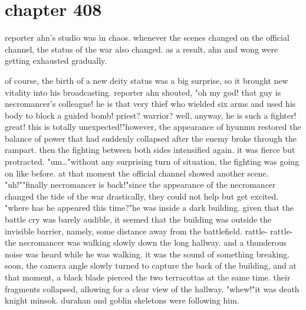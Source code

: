 \section{chapter 408}

reporter ahn's studio was in chaos.
 whenever the scenes changed on the official channel, the status of the war also changed.
 as a result, ahn and wong were getting exhausted gradually.





of course, the birth of a new deity status was a big surprise, so it brought new vitality into his broadcasting.
reporter ahn shouted, "oh my god! that guy is necromancer's colleague! he is that very thief who wielded six arms and used his body to block a guided bomb! priest? warrior? well, anyway, he is such a fighter! great! this is totally unexpected!"however, the appearance of hyunmu restored the balance of power that had suddenly collapsed after the enemy broke through the rampart.
then the fighting between both sides intensified again.
 it was fierce but protracted.
"um…"without any surprising turn of situation, the fighting was going on like before.
 at that moment the official channel showed another scene.
 "uh!""finally necromancer is back!"since the appearance of the necromancer changed the tide of the war drastically, they could not help but get excited.
 "where has he appeared this time?"he was inside a dark building.
 given that the battle cry was barely audible, it seemed that the building was outside the invisible barrier, namely, some distance away from the battlefield.
rattle- rattle-the necromancer was walking slowly down the long hallway.
 and a thunderous noise was heard while he was walking.
it was the sound of something breaking.
 soon, the camera angle slowly turned to capture the back of the building, and at that moment, a black blade pierced the two terracottas at the same time.
 their fragments collapsed, allowing for a clear view of the hallway.
"whew!"it was death knight minsok.
 durahan and goblin skeletons were following him.

